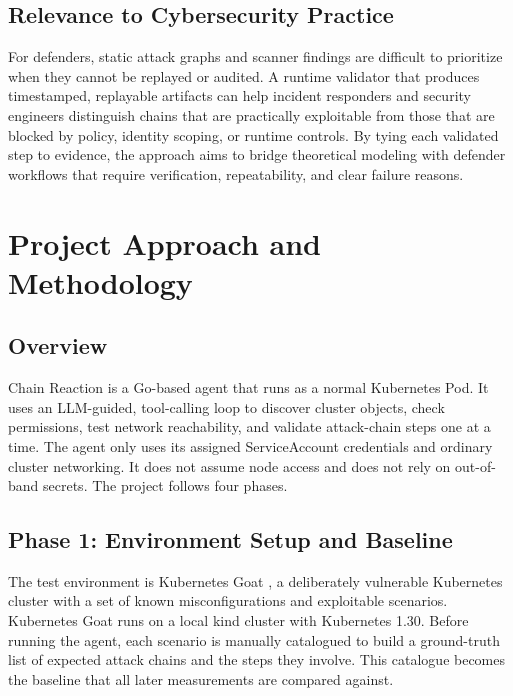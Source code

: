 \documentclass[conference]{IEEEtran}
\begin{document}
\subsection{Relevance to Cybersecurity Practice}
For defenders, static attack graphs and scanner findings are difficult to prioritize when they cannot be replayed or audited. A runtime validator that produces timestamped, replayable artifacts can help incident responders and security engineers distinguish chains that are practically exploitable from those that are blocked by policy, identity scoping, or runtime controls. By tying each validated step to evidence, the approach aims to bridge theoretical modeling with defender workflows that require verification, repeatability, and clear failure reasons.

\section{Project Approach and Methodology}

\subsection{Overview}
Chain Reaction is a Go-based agent that runs as a normal Kubernetes Pod. It uses an LLM-guided, tool-calling loop to discover cluster objects, check permissions, test network reachability, and validate attack-chain steps one at a time. The agent only uses its assigned ServiceAccount credentials and ordinary cluster networking. It does not assume node access and does not rely on out-of-band secrets. The project follows four phases.

\subsection{Phase 1: Environment Setup and Baseline}
The test environment is Kubernetes Goat \cite{kubegoat2023}, a deliberately vulnerable Kubernetes cluster with a set of known misconfigurations and exploitable scenarios. Kubernetes Goat runs on a local kind cluster with Kubernetes 1.30. Before running the agent, each scenario is manually catalogued to build a ground-truth list of expected attack chains and the steps they involve. This catalogue becomes the baseline that all later measurements are compared against.
\end{document}
